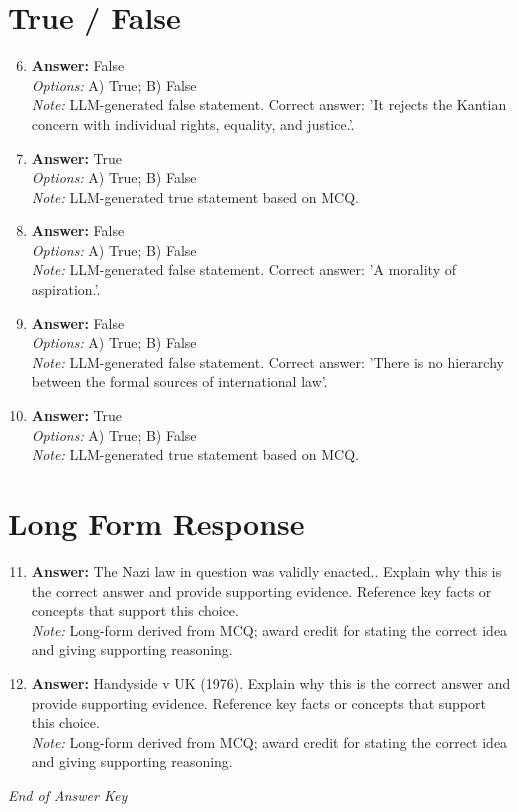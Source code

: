 \documentclass[12pt]{article}
\begin{document}
\section*{True / False}
\begin{enumerate}[label=\arabic*.]
\setcounter{enumi}{5}
\item \textbf{Answer:} False
\\ \textit{Options:} A) True; B) False
\\ \textit{Note:} LLM-generated false statement. Correct answer: 'It rejects the Kantian concern with individual rights, equality, and justice.'.
\item \textbf{Answer:} True
\\ \textit{Options:} A) True; B) False
\\ \textit{Note:} LLM-generated true statement based on MCQ.
\item \textbf{Answer:} False
\\ \textit{Options:} A) True; B) False
\\ \textit{Note:} LLM-generated false statement. Correct answer: 'A morality of aspiration.'.
\item \textbf{Answer:} False
\\ \textit{Options:} A) True; B) False
\\ \textit{Note:} LLM-generated false statement. Correct answer: 'There is no hierarchy between the formal sources of international law'.
\item \textbf{Answer:} True
\\ \textit{Options:} A) True; B) False
\\ \textit{Note:} LLM-generated true statement based on MCQ.
\end{enumerate}

\section*{Long Form Response}
\begin{enumerate}[label=\arabic*.]
\setcounter{enumi}{10}
\item \textbf{Answer:} The Nazi law in question was validly enacted.. Explain why this is the correct answer and provide supporting evidence. Reference key facts or concepts that support this choice.
\\ \textit{Note:} Long-form derived from MCQ; award credit for stating the correct idea and giving supporting reasoning.
\item \textbf{Answer:} Handyside v UK (1976). Explain why this is the correct answer and provide supporting evidence. Reference key facts or concepts that support this choice.
\\ \textit{Note:} Long-form derived from MCQ; award credit for stating the correct idea and giving supporting reasoning.
\end{enumerate}

\vfill
\noindent\textit{End of Answer Key}
\end{document}
